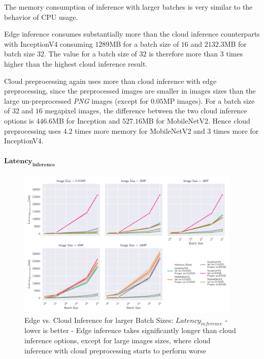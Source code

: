 The memory consumption of inference with larger batches is very similar to the behavior of CPU usage.


Edge inference consumes substantially more than the cloud inference counterparts with InceptionV4 consuming $1289$MB for a batch size of $16$ and $2132.3$MB for batch size $32$.
The value for a batch size of $32$ is therefore more than $3$ times higher than the highest cloud inference result.

Cloud preprocessing again uses more than cloud inference with edge preprocessing, since the preprocessed images are smaller in  images sizes than the large un-preprocessed \emph{PNG} images (except for $0.05$MP images).
For a batch size of $32$ and $16$ megapixel images, the difference between the two cloud inference options is $446.6$MB for Inception and $527.16$MB for MobileNetV2.
Hence cloud preprocessing uses $4.2$ times more memory for MobileNetV2 and $3$ times more for InceptionV4.




\paragraph{$\mathbf{Latency_{inference}}$}

\begin{figure}[!htb]
\centering
\includegraphics[width=0.95\textwidth]{./Bilder/single_plots/batch_size_plots/Effects_of_Batch_size_Inference_Latencies.pdf}
\caption[Edge vs. Cloud Inference for larger Batch Sizes:  $Latency_{inference}$ - lower is better]{Edge vs. Cloud Inference for larger Batch Sizes:  $Latency_{inference}$ - lower is better - Edge inference takes significantly longer than cloud inference options, except for large images sizes, where cloud inference with cloud preprocessing starts to perform worse}
\label{fig:BatchSizeInferenceLatency}
\end{figure}

